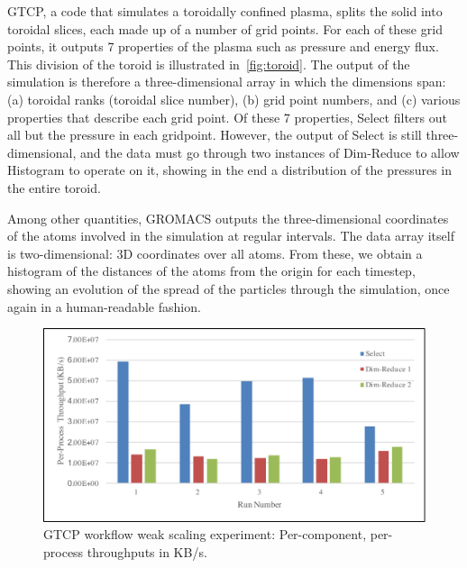 GTCP, a code that simulates a toroidally confined plasma, splits the solid into
toroidal slices, each made up of a number of grid points. For each of these
grid points, it outputs 7 properties of the plasma such as pressure and energy
flux. This division of the toroid is illustrated in~\autoref{fig:toroid}.
The output of the simulation is therefore a three-dimensional array in which
the dimensions span: (a) toroidal ranks (toroidal slice number), (b) grid point
numbers, and (c) various properties that describe each grid point.
Of these 7 properties, Select filters out all but the pressure in each gridpoint.
However, the output of Select is still three-dimensional, and the
data must go through two instances of Dim-Reduce to allow
Histogram to operate on it, showing in the end
a distribution of the pressures in the entire toroid.

Among other quantities, GROMACS outputs
the three-dimensional coordinates
of the atoms involved in the simulation
at regular intervals.
The data array itself is two-dimensional:
3D coordinates over all atoms.
From these, we obtain a histogram of the distances
of the atoms from the origin for each timestep, showing
an evolution of the spread of the particles through
the simulation, once again in a human-readable fashion.

\begin{figure}
\includegraphics[width=\columnwidth]{fig/per-component-throughput}
\caption{GTCP workflow weak scaling experiment: Per-component, per-process throughputs in KB/s.}
\label{fig:gtcp-weak-perc}
\end{figure}

